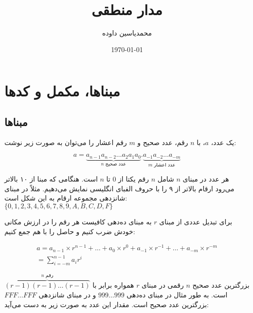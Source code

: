 \documentclass[a5paper]{article}
\author{محمدیاسین داوده}
\title{مدار منطقی}
\date{\today}
\begin{document}
\begin{titlingpage}
\maketitle


\tableofcontents
\end{titlingpage}

\section{مبناها، مکمل و کدها}
\subsection{مبناها}
یک عدد، $a$، با $n$ رقم، عدد صحیح و $m$ رقم اعشار را می‌توان به صورت زیر نوشت:

\begin{equation}
  a = \underbrace{a_{n-1}a_{n-2} \ldots a_2a_1a_0}_{\text{$n$ عدد صحیح}}.\underbrace{a_{-1}a_{-2} \ldots a_{-m}}_{\text{$m$ عدد اعشار}}
\end{equation}

هر عدد در مبنای $n$ شامل $n$ رقم یکتا از $0$ تا $n$ است.
هنگامی که مبنا از ۱۰ بالاتر می‌رود ارقام بالاتر از ۹ را با حروف الفبای انگلیسی نمایش می‌دهیم.
مثلاً در مبنای شانزدهی مجموعه ارقام به این شکل است:\\
$\{0,1,2,3,4,5,6,7,8,9,A,B,C,D,F\}$

برای تبدیل عددی از مبنای $r$ به مبنای ده‌دهی کافیست هر رقم را در
ارزش مکانی خودش ضرب کنیم و حاصل را با هم جمع کنیم:

\begin{equation}\begin{split}
  a = a_{n-1} \times r^{n-1} + \ldots + a_{0} \times r^{0} + a_{-1} \times r^{-1} + \ldots + a_{-m} \times r^{-m}\\
  = \sum_{i=-m}^{n-1}a_{i}r^{i}
\end{split}\end{equation}

بزرگترین عدد صحیح $n$ رقمی در مبنای $r$ همواره برابر با $\overbrace{(r-1)(r-1)\ldots(r-1)}^{\text{$n$ رقم}}$ است.
به طور مثال در مبنای ده‌دهی $999\ldots999$ و در مبنای شانزدهی $FFF\ldots{}FFF$ بزرگترین عدد صحیح است.
مقدار این عدد به صورت زیر به دست می‌آید:
\end{document}
